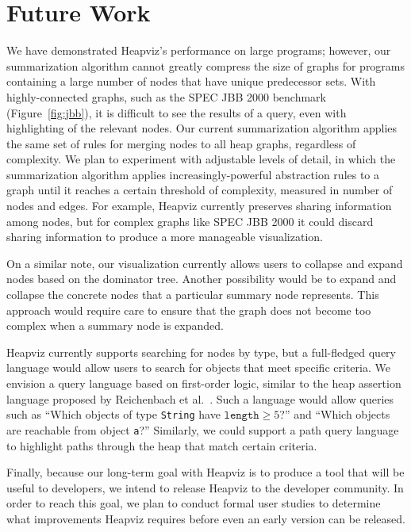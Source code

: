 

\section{Future Work}
\label{future}

We have demonstrated Heapviz's performance on large programs; however, our
summarization algorithm cannot greatly compress the size of graphs for programs
containing a large number of nodes that have unique predecessor sets.  With
highly-connected graphs, such as the SPEC JBB 2000 benchmark
(Figure~\ref{fig:jbb}), it is difficult to see the results of a query, even
with highlighting of the relevant nodes.  Our current summarization algorithm
applies the same set of rules for merging nodes to all heap graphs, regardless
of complexity.  We plan to experiment with adjustable levels of detail,
in which the summarization algorithm applies increasingly-powerful abstraction
rules to a graph until it reaches a certain threshold of complexity, 
measured in number of nodes and edges.  For example, Heapviz currently
preserves sharing information among nodes, but for complex graphs
like SPEC JBB 2000 it could discard sharing information to produce a more
manageable visualization.

On a similar note, our visualization currently allows users to collapse and
expand nodes based on the dominator tree.  Another possibility would be
to expand and collapse the concrete nodes that a particular summary 
node represents.
This approach would require care to ensure that the graph does not become
too complex when a summary node is expanded.

Heapviz currently supports searching for nodes by type, but a full-fledged
query language would allow users to search for objects that meet specific
criteria.  We envision a query language based on first-order logic, similar
to the heap assertion language proposed by Reichenbach et 
al.~\cite{reichenbach10deal}.  Such a
language would allow queries such as ``Which objects of type \texttt{String} 
have $\texttt{length} \geq 5$?'' and ``Which objects are reachable from object 
\texttt{a}?''  Similarly, we could support a path query language to highlight
paths through the heap that match certain criteria.

Finally, because our long-term goal with Heapviz is to produce a tool that 
will be useful to developers, we intend to release Heapviz to the developer community.
In order to reach this goal, we plan to conduct formal user studies to determine
what improvements Heapviz requires before even an early version can be released.

